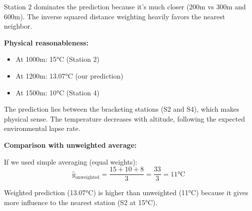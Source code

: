 \documentclass[12pt]{article}
\begin{document}
\begin{solution}
Station 2 dominates the prediction because it's much closer (200m vs 300m and 600m). The inverse squared distance weighting heavily favors the nearest neighbor.

\textbf{Physical reasonableness:}
\begin{itemize}
    \item At 1000m: 15°C (Station 2)
    \item At 1200m: 13.07°C (our prediction)
    \item At 1500m: 10°C (Station 4)
\end{itemize}

The prediction lies between the bracketing stations (S2 and S4), which makes physical sense. The temperature decreases with altitude, following the expected environmental lapse rate.

\textbf{Comparison with unweighted average:}

If we used simple averaging (equal weights):
\[
\hat{y}_{\text{unweighted}} = \frac{15 + 10 + 8}{3} = \frac{33}{3} = 11°\text{C}
\]

Weighted prediction (13.07°C) is higher than unweighted (11°C) because it gives more influence to the nearest station (S2 at 15°C).
\end{solution}
\end{document}
